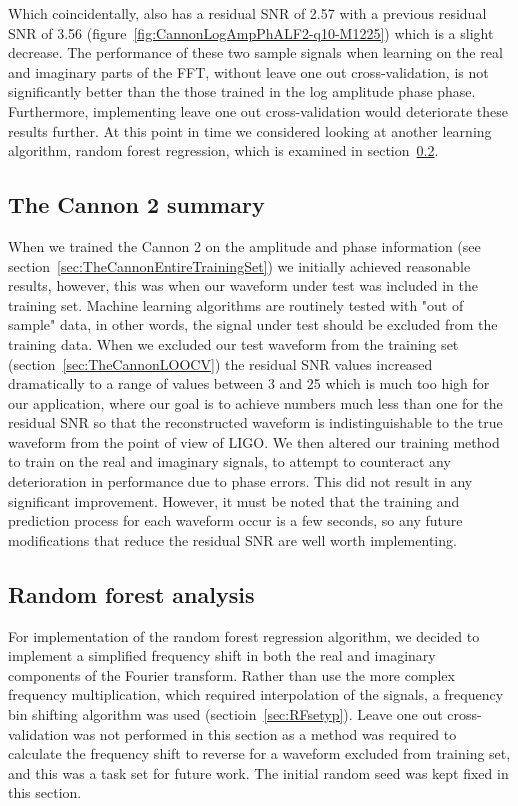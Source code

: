 Which coincidentally, also has a residual SNR of 2.57 with a previous residual SNR of 3.56 (figure~\ref{fig:CannonLogAmpPhALF2-q10-M1225}) which is a slight decrease. The performance of these two sample signals when learning on the real and imaginary parts of the FFT, without leave one out cross-validation, is  not significantly better than the those trained in the log amplitude phase phase. Furthermore, implementing leave one out cross-validation would deteriorate these results further. At this point in time we considered looking at another learning algorithm, random forest regression, which is examined in section~\ref{sec:RandomForest}.\\
\subsection{The Cannon 2 summary}
When we trained the Cannon 2 on the amplitude and phase information (see section~\ref{sec:TheCannonEntireTrainingSet}) we initially achieved reasonable results, however, this was when our waveform under test was included in the training set. Machine learning algorithms are routinely tested with "out of sample" data, in other words, the signal under test should be excluded from the training data. When we excluded our test waveform from the training set (section~\ref{sec:TheCannonLOOCV}) the residual SNR values increased dramatically to a range of values between 3 and 25 which is much too high for our application, where our goal is to achieve numbers much less than one for the residual SNR so that the reconstructed waveform is indistinguishable to the true waveform from the point of view of LIGO. We then altered our training method to train on the real and imaginary signals, to attempt to counteract any deterioration in performance due to phase errors. This did not result in any significant improvement. However, it must be noted that the training and prediction process for each waveform occur is a few seconds, so any future modifications that reduce the residual SNR are well worth implementing. 
\pagebreak
\subsection{Random forest analysis}
\label{sec:RandomForest}
For implementation of the random forest regression algorithm, we decided to implement a simplified frequency shift in both the real and imaginary components of the Fourier transform. Rather than use the more complex frequency multiplication, which required interpolation of the signals,  a frequency bin shifting algorithm was used (sectioin~\ref{sec:RFsetyp}). Leave one out cross-validation was not performed in this section  as a method was required to calculate the frequency shift to reverse for a waveform excluded from training set, and this was a task set for future work.  The initial random seed was kept fixed in this section. 
